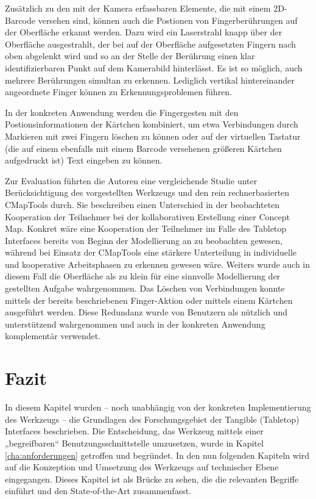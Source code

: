 Zusätzlich zu den mit der Kamera erfassbaren Elemente, die mit einem 2D-Barcode versehen sind, können auch die Postionen von Fingerberührungen auf der Oberfläche erkannt werden. Dazu wird ein Laserstrahl knapp über der Oberfläche ausgestrahlt, der bei auf der Oberfläche aufgesetzten Fingern nach oben abgelenkt wird und so an der Stelle der Berührung einen klar identifizierbaren Punkt auf dem Kamerabild hinterlässt. Es ist so möglich, auch mehrere Berührungen simultan zu erkennen. Lediglich vertikal hintereinander angeordnete Finger können zu Erkennungsproblemen führen.

In der konkreten Anwendung werden die Fingergesten mit den Postionsinformationen der Kärtchen kombiniert, um etwa Verbindungen durch Markieren mit zwei Fingern löschen zu können oder auf der virtuellen Tastatur (die auf einem ebenfalls mit einem Barcode versehenen größeren Kärtchen aufgedruckt ist) Text eingeben zu können.

Zur Evaluation führten die Autoren eine vergleichende Studie unter Berücksichtigung des vorgestellten Werkzeugs und den rein rechnerbasierten CMapTools \citep{Canas04} durch. Sie beschreiben einen Unterschied in der beobachteten Kooperation der Teilnehmer bei der kollaborativen Erstellung einer Concept Map. Konkret wäre eine Kooperation der Teilnehmer im Falle des Tabletop Interfaces bereits von Beginn der Modellierung an zu beobachten gewesen, während bei Einsatz der CMapTools eine stärkere Unterteilung in individuelle und kooperative Arbeitsphasen zu erkennen gewesen wäre. Weiters wurde auch in diesem Fall die Oberfläche als zu klein für eine sinnvolle Modellierung der gestellten Aufgabe wahrgenommen. Das Löschen von Verbindungen konnte mittels der bereits beschriebenen Finger-Aktion oder mittels einem Kärtchen ausgeführt werden. Diese Redundanz wurde von Benutzern als nützlich und unterstützend wahrgenommen und auch in der konkreten Anwendung komplementär verwendet.





\section{Fazit} %
\label{sec:impl_ueberblick_fazit}

In diesem Kapitel wurden -- noch unabhängig von der konkreten Implementierung des Werkzeugs -- die Grundlagen des Forschungsgebiet der Tangible (Tabletop) Interfaces beschrieben. Die Entscheidung, das Werkzeug mittels einer „begreifbaren“ Benutzungsschnittstelle umzusetzen, wurde in Kapitel \ref{cha:anforderungen} getroffen und begründet. In den nun folgenden Kapiteln wird auf die Konzeption und Umsetzung des Werkzeugs auf technischer Ebene eingegangen. Dieses Kapitel ist als Brücke zu sehen, die die relevanten Begriffe einführt und den State-of-the-Art zusammenfasst.

